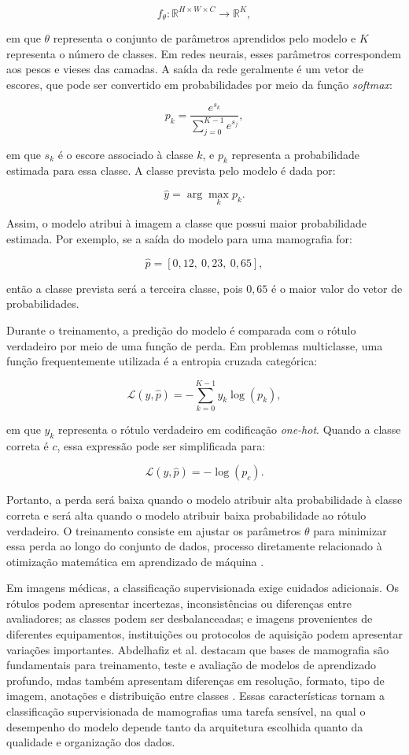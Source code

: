 \documentclass[
    12pt,
    openright,
    oneside,
    a4paper,
    english,
    brazil
]{abntex2}
\begin{document}
\[
f_{\theta}: \mathbb{R}^{H \times W \times C} \rightarrow \mathbb{R}^{K},
\]

em que \(\theta\) representa o conjunto de parâmetros aprendidos pelo modelo e \(K\) representa o número de classes. Em redes neurais, esses parâmetros correspondem aos pesos e vieses das camadas. A saída da rede geralmente é um vetor de escores, que pode ser convertido em probabilidades por meio da função \textit{softmax}:

\[
p_k =
\frac{e^{s_k}}
{\sum_{j=0}^{K-1} e^{s_j}},
\]

em que \(s_k\) é o escore associado à classe \(k\), e \(p_k\) representa a probabilidade estimada para essa classe. A classe prevista pelo modelo é dada por:

\[
\hat{y} =
\arg\max_k p_k.
\]

Assim, o modelo atribui à imagem a classe que possui maior probabilidade estimada. Por exemplo, se a saída do modelo para uma mamografia for:

\[
\hat{p} = [0{,}12,\ 0{,}23,\ 0{,}65],
\]

então a classe prevista será a terceira classe, pois \(0{,}65\) é o maior valor do vetor de probabilidades.

Durante o treinamento, a predição do modelo é comparada com o rótulo verdadeiro por meio de uma função de perda. Em problemas multiclasse, uma função frequentemente utilizada é a entropia cruzada categórica:

\[
\mathcal{L}(y,\hat{p}) =
-\sum_{k=0}^{K-1}
y_k \log(p_k),
\]

em que \(y_k\) representa o rótulo verdadeiro em codificação \textit{one-hot}. Quando a classe correta é \(c\), essa expressão pode ser simplificada para:

\[
\mathcal{L}(y,\hat{p}) =
-\log(p_c).
\]

Portanto, a perda será baixa quando o modelo atribuir alta probabilidade à classe correta e será alta quando o modelo atribuir baixa probabilidade ao rótulo verdadeiro. O treinamento consiste em ajustar os parâmetros \(\theta\) para minimizar essa perda ao longo do conjunto de dados, processo diretamente relacionado à otimização matemática em aprendizado de máquina \cite{deisenroth2020mathematics,goodfellow2016deep}.

Em imagens médicas, a classificação supervisionada exige cuidados adicionais. Os rótulos podem apresentar incertezas, inconsistências ou diferenças entre avaliadores; as classes podem ser desbalanceadas; e imagens provenientes de diferentes equipamentos, instituições ou protocolos de aquisição podem apresentar variações importantes. Abdelhafiz et al. destacam que bases de mamografia são fundamentais para treinamento, teste e avaliação de modelos de aprendizado profundo, mdas também apresentam diferenças em resolução, formato, tipo de imagem, anotações e distribuição entre classes \cite{abdelhafiz2019}. Essas características tornam a classificação supervisionada de mamografias uma tarefa sensível, na qual o desempenho do modelo depende tanto da arquitetura escolhida quanto da qualidade e organização dos dados.
\end{document}
